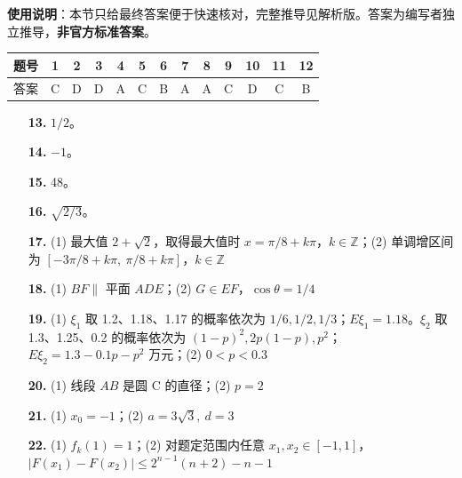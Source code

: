 
\begin{gknotice}
\textbf{使用说明}：本节只给最终答案便于快速核对，完整推导见解析版。答案为编写者独立推导，\textbf{非官方标准答案}。
\end{gknotice}

\begin{center}\begin{tabular}{ccccccccccccc}
\toprule
题号 & 1 & 2 & 3 & 4 & 5 & 6 & 7 & 8 & 9 & 10 & 11 & 12 \\
\midrule
答案 & C & D & D & A & C & B & A & A & C & D & C & B \\
\bottomrule
\end{tabular}\end{center}

\begin{itemize}[leftmargin=2.6em]
  \item[\textbf{13.}] $1/2$。
  \item[\textbf{14.}] $-1$。
  \item[\textbf{15.}] 48。
  \item[\textbf{16.}] $\sqrt{2/3}$。
\end{itemize}

\begin{itemize}[leftmargin=2.6em]
  \item[\textbf{17.}] (1) 最大值 $2+\sqrt2$，取得最大值时 $x=\pi/8+k\pi$，$k\in\mathbb Z$；(2) 单调增区间为 $[-3\pi/8+k\pi,\ \pi/8+k\pi]$，$k\in\mathbb Z$
  \item[\textbf{18.}] (1) $BF\parallel$ 平面 $ADE$；(2) $G\in EF$，$\cos\theta=1/4$
  \item[\textbf{19.}] (1) $\xi_1$ 取 1.2、1.18、1.17 的概率依次为 $1/6,1/2,1/3$；$E\xi_1=1.18$。$\xi_2$ 取 1.3、1.25、0.2 的概率依次为 $(1-p)^2,2p(1-p),p^2$；$E\xi_2=1.3-0.1p-p^2$ 万元；(2) $0<p<0.3$
  \item[\textbf{20.}] (1) 线段 $AB$ 是圆 C 的直径；(2) $p=2$
  \item[\textbf{21.}] (1) $x_0=-1$；(2) $a=3\sqrt3,\ d=3$
  \item[\textbf{22.}] (1) $f_k(1)=1$；(2) 对题定范围内任意 $x_1,x_2\in[-1,1]$，$|F(x_1)-F(x_2)|\le 2^{n-1}(n+2)-n-1$
\end{itemize}
